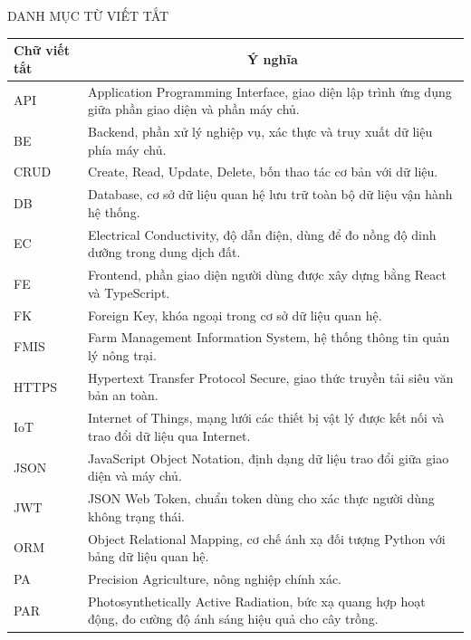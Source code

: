 \documentclass[13pt,a4paper]{extarticle}
\numberwithin{figure}{section}
\numberwithin{table}{section}
\begin{document}
	\clearpage
	\listoftables
	\clearpage
	\listoffigures
	\clearpage
	
	\begin{center}
		\fontsize{14pt}{17pt}\selectfont
		{DANH MỤC TỪ VIẾT TẮT}
	\end{center}
	
	\vspace{10pt}
	
	\begin{longtable}{|p{3cm}|p{11cm}|}
		\hline
		\textbf{Chữ viết tắt} & \multicolumn{1}{c|}{\textbf{Ý nghĩa}} \\
		\hline
		API & Application Programming Interface, giao diện lập trình ứng dụng giữa phần giao diện và phần máy chủ. \\
		\hline
		BE & Backend, phần xử lý nghiệp vụ, xác thực và truy xuất dữ liệu phía máy chủ. \\
		\hline
		CRUD & Create, Read, Update, Delete, bốn thao tác cơ bản với dữ liệu. \\
		\hline
		DB & Database, cơ sở dữ liệu quan hệ lưu trữ toàn bộ dữ liệu vận hành hệ thống. \\
		\hline
		EC & Electrical Conductivity, độ dẫn điện, dùng để đo nồng độ dinh dưỡng trong dung dịch đất. \\
		\hline
		FE & Frontend, phần giao diện người dùng được xây dựng bằng React và TypeScript. \\
		\hline
		FK & Foreign Key, khóa ngoại trong cơ sở dữ liệu quan hệ. \\
		\hline
		FMIS & Farm Management Information System, hệ thống thông tin quản lý nông trại. \\
		\hline
		HTTPS & Hypertext Transfer Protocol Secure, giao thức truyền tải siêu văn bản an toàn. \\
		\hline
		IoT & Internet of Things, mạng lưới các thiết bị vật lý được kết nối và trao đổi dữ liệu qua Internet. \\
		\hline
		JSON & JavaScript Object Notation, định dạng dữ liệu trao đổi giữa giao diện và máy chủ. \\
		\hline
		JWT & JSON Web Token, chuẩn token dùng cho xác thực người dùng không trạng thái. \\
		\hline
		ORM & Object Relational Mapping, cơ chế ánh xạ đối tượng Python với bảng dữ liệu quan hệ. \\
		\hline
		PA & Precision Agriculture, nông nghiệp chính xác. \\
		\hline
		PAR & Photosynthetically Active Radiation, bức xạ quang hợp hoạt động, đo cường độ ánh sáng hiệu quả cho cây trồng. \\

\end{longtable}
\end{document}
